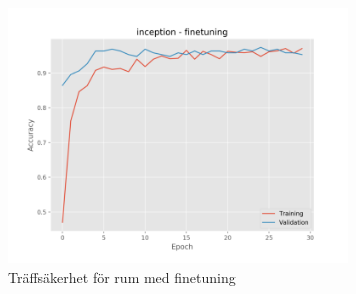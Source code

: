 \documentclass[]{kththesis}
\begin{document}
\begin{figure}[h]
    \includegraphics[width=9cm]{r_a_inception_fine}
    \caption{Träffsäkerhet för rum med finetuning}
    \label{fig:r_a_2}
  \end{figure}

\tailmatter
\end{document}
